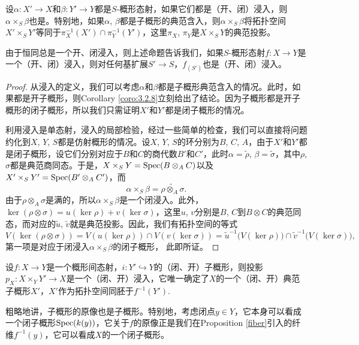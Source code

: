 \begin{pro}
设$\alpha:X'\to X$和$\beta:Y'\to Y$都是$S$-概形态射，如果它们都是（开、闭）浸入，则$\alpha\times_S\beta$也是。特别地，如果$\alpha$, $\beta$都是子概形的典范含入，则$\alpha\times_S \beta$将拓扑空间$X'\times_S Y'$等同于$\pi_X^{-1}(X')\cap \pi_Y^{-1}(Y')$，这里$\pi_X$, $\pi_Y$是$X\times_S Y$的典范投影。
\end{pro}

由于恒同总是一个开、闭浸入，则上述命题告诉我们，如果$S$-概形态射$f:X\to Y$是一个（开、闭）浸入，则对任何基扩展$S'\to S$，$f_{(S')}$也是（开、闭）浸入。

\begin{proof}
从浸入的定义，我们可以考虑$\alpha$和$\beta$都是子概形典范含入的情况。此时，如果都是开子概形，则Corollary \ref{coro:3.2.8}立刻给出了结论。因为子概形都是开子概形的闭子概形，所以我们只需证明$X'$和$Y'$都是闭子概形的情况。

利用浸入是单态射，浸入的局部检验，经过一些简单的检查，我们可以直接将问题约化到$X$, $Y$, $S$都是仿射概形的情况。设$X$, $Y$, $S$的环分别为$B$, $C$, $A$，由于$X'$和$Y'$都是闭子概形，设它们分别对应于$B$和$C$的商代数$B'$和$C'$，此时$\alpha=\widetilde{\rho}$, $\beta=\widetilde{\sigma}$，其中$\rho$, $\sigma$都是典范商同态。于是，$X\times_S Y=\operatorname{Spec}(B\otimes_A C)$以及$X'\times_S Y'=\operatorname{Spec}(B'\otimes_A C')$，而
\[
	\alpha\times_S\beta=\widetilde{\rho\otimes_A\sigma}.
\]
由于$\rho\otimes_A\sigma$是满的，所以$\alpha\times_S\beta$是一个闭浸入。此外，$\ker(\rho\otimes \sigma)=u(\ker \rho)+v(\ker \sigma)$，这里$u$, $v$分别是$B$, $C$到$B\otimes C$的典范同态，而对应的$\widetilde{u}$, $\widetilde{v}$就是典范投影。因此，我们有拓扑空间的等式
\[
	V(\ker(\rho\otimes \sigma))=V(u(\ker\rho))\cap V(v(\ker\sigma))=\widetilde{u}^{-1}\bigl(V(\ker\rho)\bigr)\cap \widetilde{v}^{-1}\bigl(V(\ker \sigma)\bigr),
\]
第一项是对应于闭浸入$\alpha\times_S \beta$的闭子概形，
此即所证。
\end{proof}

\begin{pro}[子概形的原像]
设$f:X\to Y$是一个概形间态射，$i:Y'\hookrightarrow Y$的（闭、开）子概形，则投影$p_X:X\times_Y Y'\to X$是一个（闭、开）浸入，它唯一确定了$X$的一个（闭、开）典范子概形$X'$，$X'$作为拓扑空间同胚于$f^{-1}(Y')$.
\end{pro}

粗略地讲，子概形的原像也是子概形。特别地，考虑闭点$y\in Y$，它本身可以看成一个闭子概形$\operatorname{Spec} (k(y))$，它关于$f$的原像正是我们在Proposition \ref{fiber}引入的纤维$f^{-1}(y)$，它可以看成$X$的一个闭子概形。     

